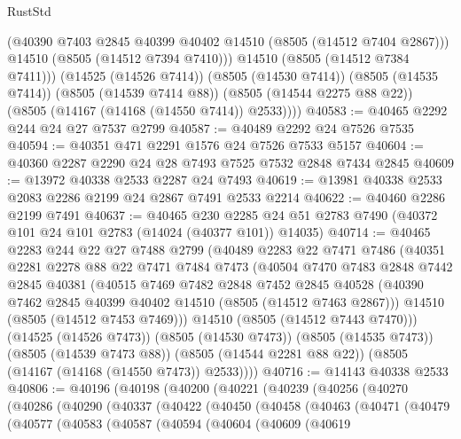 \begin{lexlean}{RustStd}
\begin{coremodule}
            (@40390 @7403 @2845 @40399 @40402 @14510 (@8505 (@14512 @7404 @2867)))
            @14510
            (@8505 (@14512 @7394 @7410)))
          @14510
          (@8505 (@14512 @7384 @7411)))
        (@14525 (@14526 @7414))
        (@8505 (@14530 @7414))
        (@8505 (@14535 @7414))
        (@8505 (@14539 @7414 @88))
        (@8505 (@14544 @2275 @88 @22))
        (@8505 (@14167 (@14168 (@14550 @7414)) @2533))))
@40583 := @40465 @2292 @244 @24 @27 @7537 @2799
@40587 := @40489 @2292 @24 @7526 @7535
@40594 := @40351 @471 @2291 @1576 @24 @7526 @7533 @5157
@40604 := @40360 @2287 @2290 @24 @28 @7493 @7525 @7532 @2848 @7434 @2845
@40609 := @13972 @40338 @2533 @2287 @24 @7493
@40619 := @13981 @40338 @2533 @2083 @2286 @2199 @24 @2867 @7491 @2533 @2214
@40622 := @40460 @2286 @2199 @7491
@40637 := @40465
    @230
    @2285
    @24
    @51
    @2783
    @7490
    (@40372 @101 @24 @101 @2783 (@14024 (@40377 @101)) @14035)
@40714 := @40465
    @2283
    @244
    @22
    @27
    @7488
    @2799
    (@40489
      @2283
      @22
      @7471
      @7486
      (@40351
        @2281
        @2278
        @88
        @22
        @7471
        @7484
        @7473
        (@40504
          @7470
          @7483
          @2848
          @7442
          @2845
          @40381
          (@40515
            @7469
            @7482
            @2848
            @7452
            @2845
            @40528
            (@40390 @7462 @2845 @40399 @40402 @14510 (@8505 (@14512 @7463 @2867)))
            @14510
            (@8505 (@14512 @7453 @7469)))
          @14510
          (@8505 (@14512 @7443 @7470)))
        (@14525 (@14526 @7473))
        (@8505 (@14530 @7473))
        (@8505 (@14535 @7473))
        (@8505 (@14539 @7473 @88))
        (@8505 (@14544 @2281 @88 @22))
        (@8505 (@14167 (@14168 (@14550 @7473)) @2533))))
@40716 := @14143 @40338 @2533
@40806 := @40196
    (@40198
      (@40200
        (@40221
          (@40239
            (@40256
              (@40270
                (@40286
                  (@40290
                    (@40337
                      (@40422
                        (@40450
                          (@40458
                            (@40463
                              (@40471
                                (@40479
                                  (@40577
                                    (@40583
                                      (@40587
                                        (@40594
                                          (@40604
                                            (@40609
                                              (@40619

\end{coremodule}
\end{lexlean}
